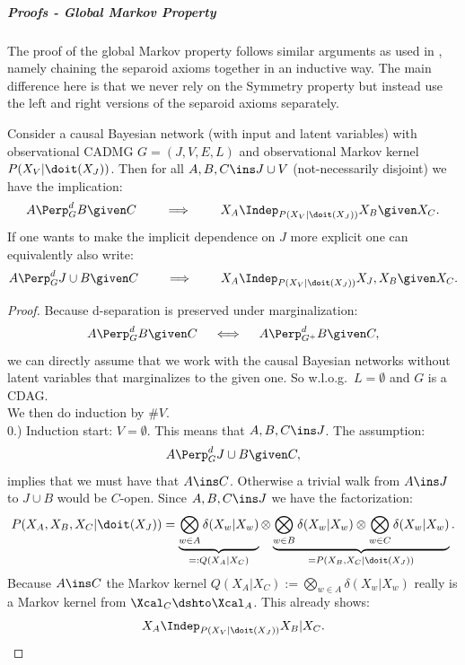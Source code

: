 \subparagraph{Proofs - Global Markov Property }\hfill

The proof of the global Markov property follows similar arguments as used in \cite{Lau90, Ver93, Ric03, FM17, FM18, RERS17}, 
namely chaining the separoid axioms together in an inductive way.
The main difference here is that we never rely on the Symmetry property but instead use 
the left and right versions of the separoid axioms separately.


\begin{Thm}
\label{GMP-CCBN}
Consider a causal Bayesian network (with input and latent variables) with observational CADMG $G=(J,V,E,L)$ 
and observational Markov kernel $P(X_V|\doit(X_J))$.
Then for all $A, B, C \ins J \cup V$ (not-necessarily disjoint) we have the implication:
\[ A \Perp^d_G B \given C \qquad \implies \qquad X_A \Indep_{P(X_V|\doit(X_J))} X_B \given X_C.   \]
If one wants to make the implicit dependence on $J$ more explicit one can equivalently also write:
\[ A \Perp^d_G J \cup B \given C \qquad \implies \qquad X_A \Indep_{P(X_V|\doit(X_J))} X_J,X_{B} \given X_C.   \]
\begin{proof}
Because d-separation is preserved under marginalization:
\[ A \Perp^d_G B \given C \quad \iff \quad A \Perp^d_{G^+} B \given C,   \]
we can directly assume that we work with the causal Bayesian networks without latent variables that marginalizes to the given one.
So w.l.o.g.\ $L=\emptyset$ and $G$ is a CDAG.\\
We then do induction by $\#V$. \\


0.) Induction start:  $V= \emptyset$. This means that $A,B,C \ins J$.
The assumption: 
\[A \Perp^d_G J \cup B \given C,\] 
implies that we must have that $A \ins C$. Otherwise a trivial walk from $A \ins J$ to $J \cup B$ would be $C$-open.
Since $A,B,C \ins J$ we have the factorization:
\[ P(X_A,X_B,X_C|\doit(X_J)) = \underbrace{\bigotimes_{w \in A} \delta(X_w|X_w)}_{=:Q(X_A|X_C)} \otimes 
 \underbrace{\bigotimes_{w \in B} \delta(X_w|X_w) \otimes \bigotimes_{w \in C} \delta(X_w|X_w)}_{=P(X_B,X_C|\doit(X_J))}.  \]
 Because $A \ins C$ the Markov kernel $Q(X_A|X_C):= \bigotimes_{w \in A} \delta(X_w|X_w) $ 
 really is a Markov kernel from $\Xcal_C \dshto \Xcal_A$.
This already shows:
\[ X_A \Indep_{P(X_V|\doit(X_J))} X_B |X_C.\]


\end{proof}
\end{Thm}
